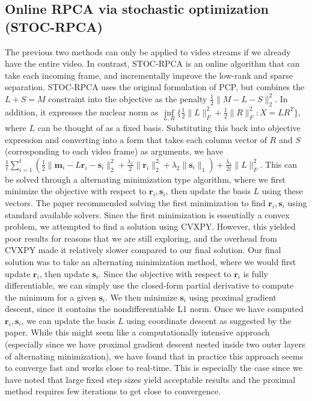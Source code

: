 \documentclass[oneside]{article}
\begin{document}
\subsection{Online RPCA via stochastic optimization (STOC-RPCA)}
The previous two methods can only be applied to video streams if we already have the entire video. In contrast, STOC-RPCA is an online algorithm that can take each incoming frame, and incrementally improve the low-rank and sparse separation. STOC-RPCA uses the original formulation of PCP, but combines the $L+S=M$ constraint into the objective as the penalty $\frac{1}{2}\lVert M-L-S\rVert_{2}^{2}$. In addition, it expresses the nuclear norm as $\inf\limits_{L,R}\{\frac{1}{2}\lVert L\rVert_{F}^{2} +\frac{1}{2}\lVert R\rVert_{F}^{2}: X = LR^{T}\}$, where $L$ can be thought of as a fixed basis. Substituting this back into objective expression and converting into a form that takes each column vector of $R$ and $S$ (corresponding to each video frame) as arguments, we have $\frac{1}{t}\sum_{i=1}^{t}(\frac{1}{2}\lVert \textbf{m}_{i} - L\textbf{r}_{i} - \textbf{s}_{i}\rVert_{2}^{2} +\frac{\lambda_{1}}{2}\lVert \textbf{r}_{i}\rVert^{2}_{2} +\lambda_{2}\lVert \textbf{s}_{i}\rVert_{1}) + \frac{\lambda_{1}}{2t}\lVert L\rVert_{F}^{2}$. This can be solved through a alternating minimization type algorithm, where we first minimize the objective with respect to $\textbf{r}_{i}, \textbf{s}_{i}$, then update the basis $L$ using these vectors.\newline\newline
The paper recommended solving the first minimization to find $\textbf{r}_{i}, \textbf{s}_{i}$ using standard available solvers. Since the first minimization is essentially a convex problem, we attempted to find a solution using CVXPY. However, this yielded poor results for reasons that we are still exploring, and the overhead from CVXPY made it relatively slower compared to our final solution. Our final solution was to take an alternating minimization method, where we would first update $\textbf{r}_{i}$, then update $\textbf{s}_{i}$. Since the objective with respect to $\textbf{r}_{i}$ is fully differentiable, we can simply use the closed-form partial derivative to compute the minimum for a given $\textbf{s}_{i}$. We then minimize $\textbf{s}_{i}$ using proximal gradient descent, since it contains the nondifferentiable L1 norm. Once we have computed $\textbf{r}_{i}, \textbf{s}_{i}$, we can update the basis $L$ using coordinate descent as suggested by the paper. While this might seem like a computationally intensive approach (especially since we have proximal gradient descent nested inside two outer layers of alternating minimization), we have found that in practice this approach seems to converge fast and works close to real-time. This is especially the case since we have noted that large fixed step sizes yield acceptable results and the proximal method requires few iterations to get close to convergence.
\end{document}
